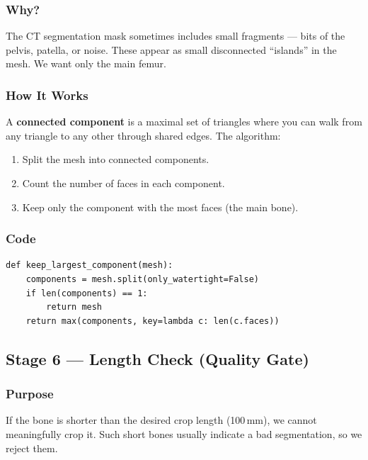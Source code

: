 \documentclass[12pt,a4paper]{article}
\begin{document}
\subsubsection{Why?}

The CT segmentation mask sometimes includes small fragments — bits of the
pelvis, patella, or noise.  These appear as small disconnected ``islands'' in
the mesh.  We want only the main femur.

\subsubsection{How It Works}

A \textbf{connected component} is a maximal set of triangles where you can walk
from any triangle to any other through shared edges.  The algorithm:

\begin{enumerate}
    \item Split the mesh into connected components.
    \item Count the number of faces in each component.
    \item Keep only the component with the most faces (the main bone).
\end{enumerate}

\subsubsection{Code}

\begin{lstlisting}
def keep_largest_component(mesh):
    components = mesh.split(only_watertight=False)
    if len(components) == 1:
        return mesh
    return max(components, key=lambda c: len(c.faces))
\end{lstlisting}


\subsection{Stage 6 — Length Check (Quality Gate)}

\subsubsection{Purpose}

If the bone is shorter than the desired crop length (100\,mm), we cannot
meaningfully crop it.  Such short bones usually indicate a bad segmentation,
so we reject them.
\end{document}
